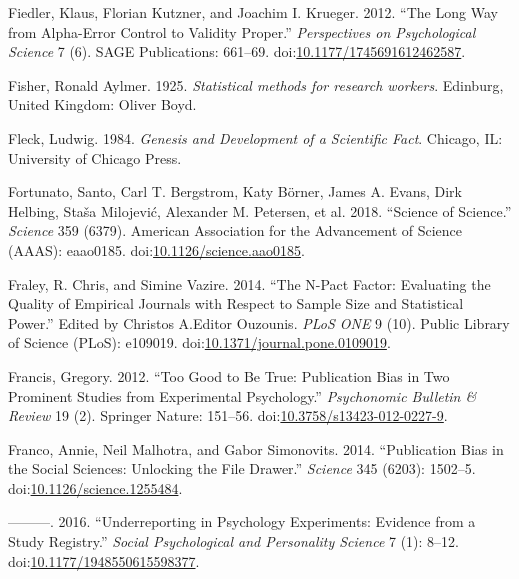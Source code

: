 \documentclass[a5paper]{book}
\begin{document}
\hypertarget{ref-doi:10.1177ux2f1745691612462587}{}
Fiedler, Klaus, Florian Kutzner, and Joachim I. Krueger. 2012. ``The
Long Way from Alpha-Error Control to Validity Proper.''
\emph{Perspectives on Psychological Science} 7 (6). SAGE Publications:
661--69.
doi:\href{https://doi.org/10.1177/1745691612462587}{10.1177/1745691612462587}.

\hypertarget{ref-Fisher1925-jl}{}
Fisher, Ronald Aylmer. 1925. \emph{Statistical methods for research
workers}. Edinburg, United Kingdom: Oliver Boyd.

\hypertarget{ref-isbn:9780226253251}{}
Fleck, Ludwig. 1984. \emph{Genesis and Development of a Scientific
Fact}. Chicago, IL: University of Chicago Press.

\hypertarget{ref-doi:10.1126ux2fscience.aao0185}{}
Fortunato, Santo, Carl T. Bergstrom, Katy Börner, James A. Evans, Dirk
Helbing, Staša Milojević, Alexander M. Petersen, et al. 2018. ``Science
of Science.'' \emph{Science} 359 (6379). American Association for the
Advancement of Science (AAAS): eaao0185.
doi:\href{https://doi.org/10.1126/science.aao0185}{10.1126/science.aao0185}.

\hypertarget{ref-doi:10.1371ux2fjournal.pone.0109019}{}
Fraley, R. Chris, and Simine Vazire. 2014. ``The N-Pact Factor:
Evaluating the Quality of Empirical Journals with Respect to Sample Size
and Statistical Power.'' Edited by Christos A.Editor Ouzounis.
\emph{PLoS ONE} 9 (10). Public Library of Science (PLoS): e109019.
doi:\href{https://doi.org/10.1371/journal.pone.0109019}{10.1371/journal.pone.0109019}.

\hypertarget{ref-doi:10.3758ux2fs13423-012-0227-9}{}
Francis, Gregory. 2012. ``Too Good to Be True: Publication Bias in Two
Prominent Studies from Experimental Psychology.'' \emph{Psychonomic
Bulletin \& Review} 19 (2). Springer Nature: 151--56.
doi:\href{https://doi.org/10.3758/s13423-012-0227-9}{10.3758/s13423-012-0227-9}.

\hypertarget{ref-doi:10.1126ux2fscience.1255484}{}
Franco, Annie, Neil Malhotra, and Gabor Simonovits. 2014. ``Publication
Bias in the Social Sciences: Unlocking the File Drawer.'' \emph{Science}
345 (6203): 1502--5.
doi:\href{https://doi.org/10.1126/science.1255484}{10.1126/science.1255484}.

\hypertarget{ref-doi:10.1177ux2f1948550615598377}{}
---------. 2016. ``Underreporting in Psychology Experiments: Evidence
from a Study Registry.'' \emph{Social Psychological and Personality
Science} 7 (1): 8--12.
doi:\href{https://doi.org/10.1177/1948550615598377}{10.1177/1948550615598377}.
\end{document}
